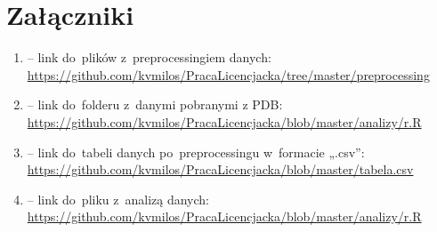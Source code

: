 \documentclass[licencjacka]{pracamgr_Kogni}
\begin{document}
    \chapter*{Załączniki}

    \begin{enumerate}
        \item{ -- link do~plików z~preprocessingiem danych: \url{https://github.com/kvmilos/PracaLicencjacka/tree/master/preprocessing}
            \label {zal:a}}
        \item{ -- link do~folderu z~danymi pobranymi z PDB: \url{https://github.com/kvmilos/PracaLicencjacka/blob/master/analizy/r.R}
            \label {zal:b}}
        \item{ -- link do~tabeli danych po~preprocessingu w~formacie „.csv”: \url{https://github.com/kvmilos/PracaLicencjacka/blob/master/tabela.csv}
            \label {zal:c}}
        \item{ -- link do~pliku z~analizą danych: \url{https://github.com/kvmilos/PracaLicencjacka/blob/master/analizy/r.R}
            \label {zal:d}}
    \end{enumerate}
\end{document}
